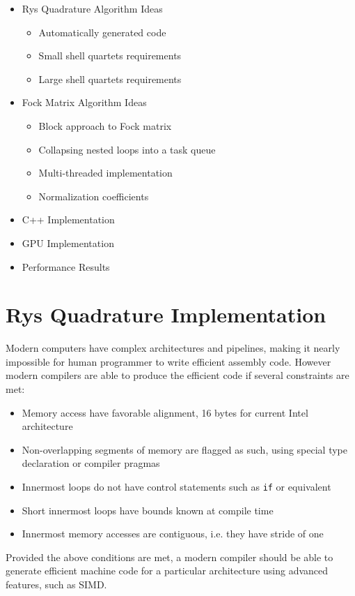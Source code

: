 \documentclass[12pt]{article}
\begin{document}
\begin{itemize}
  \item Rys Quadrature Algorithm Ideas
    \begin{itemize}
    \item Automatically generated code
    \item Small shell quartets requirements
    \item Large shell quartets requirements
    \end{itemize}
  \item Fock Matrix Algorithm Ideas
    \begin{itemize}
    \item Block approach to Fock matrix
    \item Collapsing nested loops into a task queue
    \item Multi-threaded implementation
    \item Normalization coefficients
    \end{itemize}
  \item C++ Implementation
  \item GPU Implementation
  \item Performance Results
\end{itemize}


\section*{Rys Quadrature Implementation}
Modern computers have complex architectures and pipelines, making it nearly
impossible for human programmer to write efficient assembly code.  However
modern compilers are able to produce the efficient code if several constraints
are met:

\begin{itemize}
\item Memory access have favorable alignment, 16 bytes for current Intel
  architecture
\item Non-overlapping segments of memory are flagged as such, using special type
  declaration or compiler pragmas
\item Innermost loops do not have control statements such as {\tt if} or equivalent
\item Short innermost loops have bounds known at compile time
\item Innermost memory accesses are contiguous, i.e. they have stride of one
\end{itemize}

Provided the above conditions are met, a modern compiler should be able to
generate efficient machine code for a particular architecture using advanced
features, such as SIMD.
\end{document}
